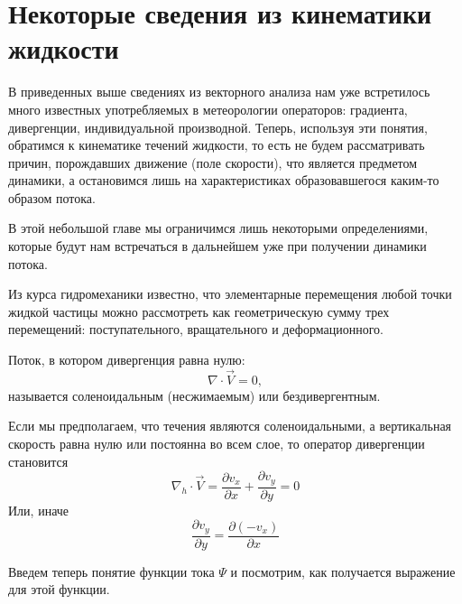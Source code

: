 \chapter{{\color{vms}Некоторые сведения из кинематики жидкости}} \label{ch2}

В приведенных выше сведениях из векторного анализа нам уже встретилось много известных употребляемых в метеорологии  операторов: градиента, дивергенции, индивидуальной производной. Теперь, используя эти понятия, обратимся к кинематике течений жидкости, то есть не будем рассматривать причин, порождавших движение (поле скорости), что является предметом динамики, а остановимся лишь на характеристиках образовавшегося каким-то образом потока.

В этой небольшой главе мы ограничимся лишь некоторыми определениями, которые будут нам встречаться в дальнейшем уже при получении динамики потока.

Из курса гидромеханики известно, что элементарные перемещения любой точки жидкой частицы можно рассмотреть как геометрическую сумму трех перемещений: поступательного, вращательного и деформационного.

Поток, в котором дивергенция равна нулю:
\begin{equation}
\nabla \cdot \vec{V} = 0,
\end{equation}
называется соленоидальным (несжимаемым) или бездивергентным.



Если мы предполагаем, что течения являются соленоидальными, а вертикальная скорость равна нулю или постоянна во всем слое, то оператор дивергенции становится
\begin{equation}
\nabla_h \cdot \vec{V} = \frac{\partial v_x}{\partial x} + \frac{\partial v_y}{\partial y} = 0
\end{equation}
Или, иначе 
\begin{equation}
\frac{\partial v_y}{\partial y} = \frac{\partial (-v_x)}{\partial x}
\end{equation}

Введем теперь понятие функции тока $\Psi$ и посмотрим, как получается выражение для этой функции.


